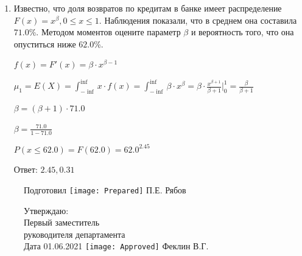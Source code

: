 \documentclass[a4paper,14pt]{article}
\begin{document}
\begin{enumerate}
\item

    
	Известно, что доля возвратов по кредитам в банке имеет распределение $F(x) = x^{\beta}, 0 \le x \le 1$. Наблюдения показали, что в среднем она составила $71.0$\%. Методом моментов оцените параметр $\beta$ и вероятность того, что она опуститься ниже $62.0$\%.
	


	

	$f(x) = F'(x) = \beta \cdot x^{\beta - 1}$

	$\mu_{1} = E(X) = \int_{-\inf}^{\inf}x \cdot f(x) = \int_{-\inf}^{\inf} \beta \cdot x^{\beta} = \beta \cdot \frac{x^{\beta + 1}}{\beta + 1}\bigg|_0^1 = \frac{\beta}{\beta + 1}$

	$\beta = (\beta + 1) \cdot 71.0$

	$\beta = \frac{71.0}{1 - 71.0}$

	$ P(x \le 62.0) = F(62.0) = 62.0^{2.45} $

    Ответ: $2.45, 0.31$
	

\end{enumerate}

\begin{figure}[H]
	Подготовил
	\hfill
	\texttt{[image: Prepared]}
	П.Е. Рябов
\end{figure}


\begin{figure}[H]
	Утверждаю:\\
	Первый заместитель\\
	руководителя департамента\\
	Дата 01.06.2021
	\hfill
	\texttt{[image: Approved]}
	Феклин В.Г.
\end{figure}
\end{document}
